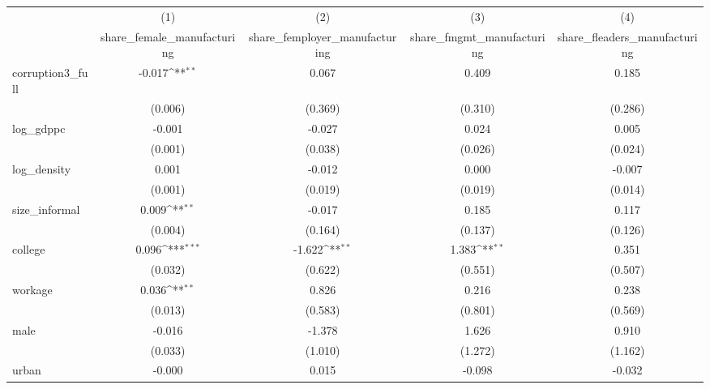 {
\def\sym#1{\ifmmode^{#1}\else\(^{#1}\)\fi}
\begin{tabular}{l*{4}{c}}
\hline\hline
            &\multicolumn{1}{c}{(1)}&\multicolumn{1}{c}{(2)}&\multicolumn{1}{c}{(3)}&\multicolumn{1}{c}{(4)}\\
            &\multicolumn{1}{c}{share\_female\_manufacturing}&\multicolumn{1}{c}{share\_femployer\_manufacturing}&\multicolumn{1}{c}{share\_fmgmt\_manufacturing}&\multicolumn{1}{c}{share\_fleaders\_manufacturing}\\
\hline
corruption3\_full&      -0.017\sym{**} &       0.067         &       0.409         &       0.185         \\
            &     (0.006)         &     (0.369)         &     (0.310)         &     (0.286)         \\
[1em]
log\_gdppc   &      -0.001         &      -0.027         &       0.024         &       0.005         \\
            &     (0.001)         &     (0.038)         &     (0.026)         &     (0.024)         \\
[1em]
log\_density &       0.001         &      -0.012         &       0.000         &      -0.007         \\
            &     (0.001)         &     (0.019)         &     (0.019)         &     (0.014)         \\
[1em]
size\_informal&       0.009\sym{**} &      -0.017         &       0.185         &       0.117         \\
            &     (0.004)         &     (0.164)         &     (0.137)         &     (0.126)         \\
[1em]
college     &       0.096\sym{***}&      -1.622\sym{**} &       1.383\sym{**} &       0.351         \\
            &     (0.032)         &     (0.622)         &     (0.551)         &     (0.507)         \\
[1em]
workage     &       0.036\sym{**} &       0.826         &       0.216         &       0.238         \\
            &     (0.013)         &     (0.583)         &     (0.801)         &     (0.569)         \\
[1em]
male        &      -0.016         &      -1.378         &       1.626         &       0.910         \\
            &     (0.033)         &     (1.010)         &     (1.272)         &     (1.162)         \\
[1em]
urban       &      -0.000         &       0.015         &      -0.098         &      -0.032         \\

\end{tabular}}
